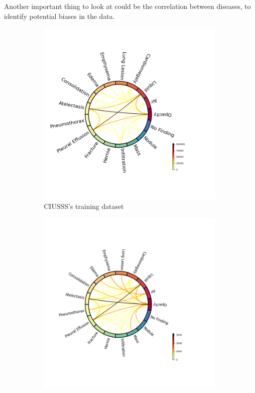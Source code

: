 \documentclass[11pt]{article}
\begin{document}
    Another important thing to look at could be the correlation between diseases, to identify potential biases in the data.


\begin{figure}[!h]
     \centering
     \begin{subfigure}[b]{0.45\linewidth}
         \centering
         \includegraphics[width=\linewidth]{plots/chords_ciusss_train}
         \caption{CIUSSS's training dataset}
         \vspace{4ex}
         \label{fig:chords_ciusss_train}
     \end{subfigure}
     \hfill
     \begin{subfigure}[b]{0.45\linewidth}
         \centering
         \includegraphics[width=\linewidth]{plots/chords_ciusss_valid}

\end{subfigure}
\end{figure}
\end{document}
